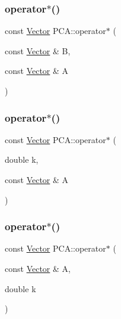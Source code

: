 \hypertarget{namespace_p_c_a_a49f60e2a8814942d40f8df470c723214}{}\label{namespace_p_c_a_a49f60e2a8814942d40f8df470c723214} 
\subsubsection{\texorpdfstring{operator$\ast$()}{operator*()}\hspace{0.1cm}{\footnotesize\ttfamily [1/3]}}
{\footnotesize\ttfamily const \hyperlink{class_p_c_a_1_1_vector}{Vector} P\+C\+A\+::operator$\ast$ (\begin{DoxyParamCaption}\item[{const \hyperlink{class_p_c_a_1_1_vector}{Vector} \&}]{B,  }\item[{const \hyperlink{class_p_c_a_1_1_vector}{Vector} \&}]{A }\end{DoxyParamCaption})\hspace{0.3cm}{\ttfamily [inline]}}

\hypertarget{namespace_p_c_a_a6f1801f8e53ab87a1f3175ec18fa3115}{}\label{namespace_p_c_a_a6f1801f8e53ab87a1f3175ec18fa3115} 
\subsubsection{\texorpdfstring{operator$\ast$()}{operator*()}\hspace{0.1cm}{\footnotesize\ttfamily [2/3]}}
{\footnotesize\ttfamily const \hyperlink{class_p_c_a_1_1_vector}{Vector} P\+C\+A\+::operator$\ast$ (\begin{DoxyParamCaption}\item[{double}]{k,  }\item[{const \hyperlink{class_p_c_a_1_1_vector}{Vector} \&}]{A }\end{DoxyParamCaption})\hspace{0.3cm}{\ttfamily [inline]}}

\hypertarget{namespace_p_c_a_a58012056e60671ce13c8318b3cd1ec8f}{}\label{namespace_p_c_a_a58012056e60671ce13c8318b3cd1ec8f} 
\subsubsection{\texorpdfstring{operator$\ast$()}{operator*()}\hspace{0.1cm}{\footnotesize\ttfamily [3/3]}}
{\footnotesize\ttfamily const \hyperlink{class_p_c_a_1_1_vector}{Vector} P\+C\+A\+::operator$\ast$ (\begin{DoxyParamCaption}\item[{const \hyperlink{class_p_c_a_1_1_vector}{Vector} \&}]{A,  }\item[{double}]{k }\end{DoxyParamCaption})\hspace{0.3cm}{\ttfamily [inline]}}

